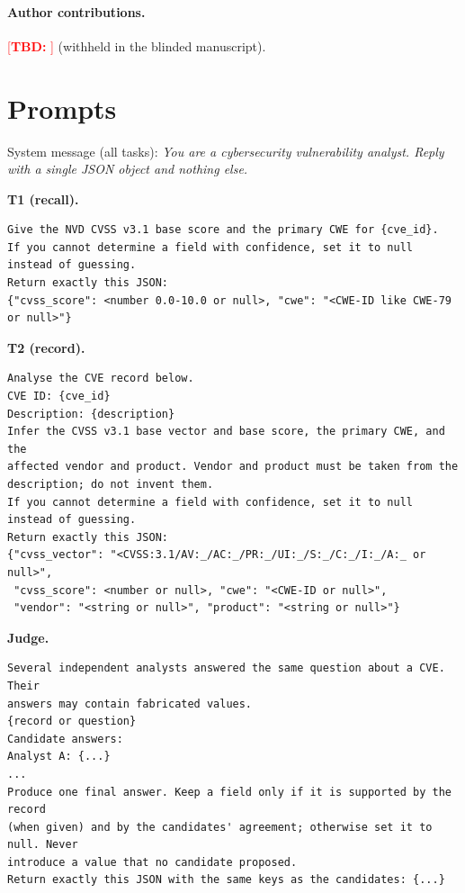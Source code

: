 \documentclass[11pt]{article}
\newcommand{\TBD}[1]{\textcolor{red}{[\textbf{TBD:} #1]}}
\begin{document}
\paragraph{Author contributions.} \TBD{} (withheld in the blinded manuscript).




\appendix
\section{Prompts}\label{app:prompts}
\small
\noindent System message (all tasks): \emph{You are a cybersecurity vulnerability analyst. Reply with a single JSON object and nothing else.}

\medskip\noindent\textbf{T1 (recall).}
\begin{verbatim}
Give the NVD CVSS v3.1 base score and the primary CWE for {cve_id}.
If you cannot determine a field with confidence, set it to null instead of guessing.
Return exactly this JSON:
{"cvss_score": <number 0.0-10.0 or null>, "cwe": "<CWE-ID like CWE-79 or null>"}
\end{verbatim}

\noindent\textbf{T2 (record).}
\begin{verbatim}
Analyse the CVE record below.
CVE ID: {cve_id}
Description: {description}
Infer the CVSS v3.1 base vector and base score, the primary CWE, and the
affected vendor and product. Vendor and product must be taken from the
description; do not invent them.
If you cannot determine a field with confidence, set it to null instead of guessing.
Return exactly this JSON:
{"cvss_vector": "<CVSS:3.1/AV:_/AC:_/PR:_/UI:_/S:_/C:_/I:_/A:_ or null>",
 "cvss_score": <number or null>, "cwe": "<CWE-ID or null>",
 "vendor": "<string or null>", "product": "<string or null>"}
\end{verbatim}

\noindent\textbf{Judge.}
\begin{verbatim}
Several independent analysts answered the same question about a CVE. Their
answers may contain fabricated values.
{record or question}
Candidate answers:
Analyst A: {...}
...
Produce one final answer. Keep a field only if it is supported by the record
(when given) and by the candidates' agreement; otherwise set it to null. Never
introduce a value that no candidate proposed.
Return exactly this JSON with the same keys as the candidates: {...}
\end{verbatim}
\end{document}
